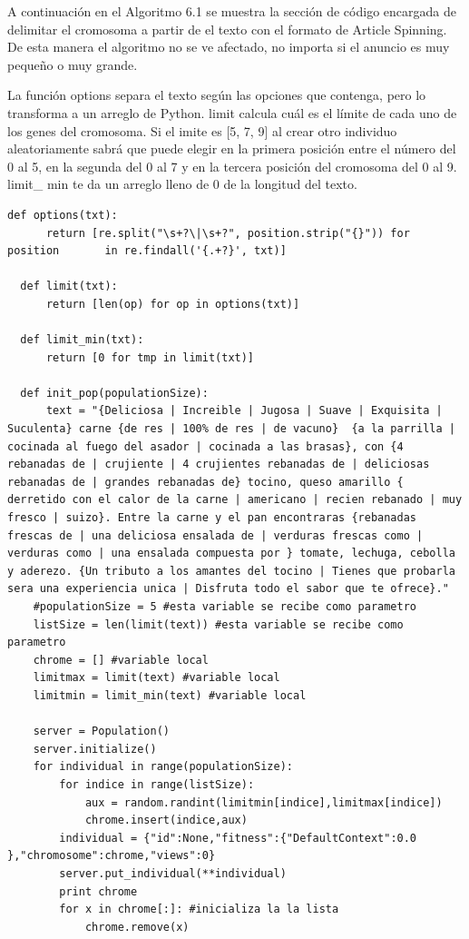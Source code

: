 A continuación en el Algoritmo 6.1 se muestra la sección de código encargada de delimitar el cromosoma a partir de el texto con el formato de Article Spinning. De esta manera el algoritmo no se ve afectado, no importa si el anuncio es muy pequeño o muy grande. 

La función options separa el texto según las opciones que contenga, pero lo transforma a un arreglo de Python. limit calcula cuál es el límite de cada uno de los genes del cromosoma. Si el imite es [5, 7, 9] al crear otro individuo aleatoriamente sabrá que puede elegir en la primera posición entre el número del 0 al 5, en la segunda del 0 al 7 y en la tercera posición del cromosoma del 0 al 9. limit\_ min te da un arreglo lleno de 0 de la longitud del texto.



\begin{lstlisting}[frame=single]
  def options(txt):
      return [re.split("\s+?\|\s+?", position.strip("{}")) for position       in re.findall('{.+?}', txt)]

  def limit(txt):
      return [len(op) for op in options(txt)]

  def limit_min(txt):
      return [0 for tmp in limit(txt)]

  def init_pop(populationSize):
      text = "{Deliciosa | Increible | Jugosa | Suave | Exquisita |   Suculenta} carne {de res | 100% de res | de vacuno}  {a la parrilla | cocinada al fuego del asador | cocinada a las brasas}, con {4 rebanadas de | crujiente | 4 crujientes rebanadas de | deliciosas rebanadas de | grandes rebanadas de} tocino, queso amarillo { derretido con el calor de la carne | americano | recien rebanado | muy fresco | suizo}. Entre la carne y el pan encontraras {rebanadas frescas de | una deliciosa ensalada de | verduras frescas como | verduras como | una ensalada compuesta por } tomate, lechuga, cebolla y aderezo. {Un tributo a los amantes del tocino | Tienes que probarla sera una experiencia unica | Disfruta todo el sabor que te ofrece}."
    #populationSize = 5 #esta variable se recibe como parametro
    listSize = len(limit(text)) #esta variable se recibe como parametro
    chrome = [] #variable local
    limitmax = limit(text) #variable local
    limitmin = limit_min(text) #variable local
    
    server = Population()
    server.initialize()
    for individual in range(populationSize):
        for indice in range(listSize):
            aux = random.randint(limitmin[indice],limitmax[indice])
            chrome.insert(indice,aux)
        individual = {"id":None,"fitness":{"DefaultContext":0.0 },"chromosome":chrome,"views":0}
        server.put_individual(**individual)
        print chrome
        for x in chrome[:]: #inicializa la la lista
            chrome.remove(x)

\end{lstlisting}

